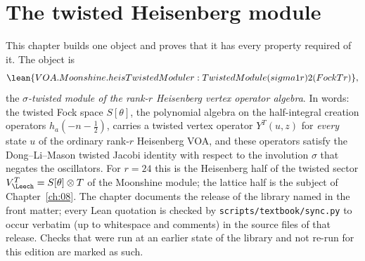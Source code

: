 \chapter{The twisted Heisenberg module}\label{ch:07}

\providecommand{\chsevenF}{\widetilde{F}}
\providecommand{\chsevenst}{\mathbin{\star}}

This chapter builds one object and proves that it has every property required of it. The
object is
\begin{equation*}
  \lean{VOA.Moonshine.heisTwistedModule r : TwistedModule (sigma1 r) 2 (FockT r)},
\end{equation*}
the \emph{$\sigma$-twisted module of the rank-$r$ Heisenberg vertex operator algebra}. In words:
the twisted Fock space $S[\theta]$, the polynomial algebra on the half-integral creation
operators $h_a(-n-\tfrac12)$, carries a twisted vertex operator $Y^T(u,z)$ for \emph{every}
state $u$ of the ordinary rank-$r$ Heisenberg VOA, and these operators satisfy the
Dong--Li--Mason twisted Jacobi identity with respect to the involution $\sigma$ that negates the
oscillators. For $r = 24$ this is the Heisenberg half of the twisted sector $V_\Leech^T =
S[\theta]\otimes T$ of the Moonshine module; the lattice half is the subject of
Chapter~\ref{ch:08}. The chapter documents the release of the library named in the front matter; every Lean quotation is checked by \texttt{scripts/textbook/sync.py} to occur verbatim
(up to whitespace and comments) in the source files of that release. Checks that were run at an earlier state of the library and not re-run for this edition are marked as such.

